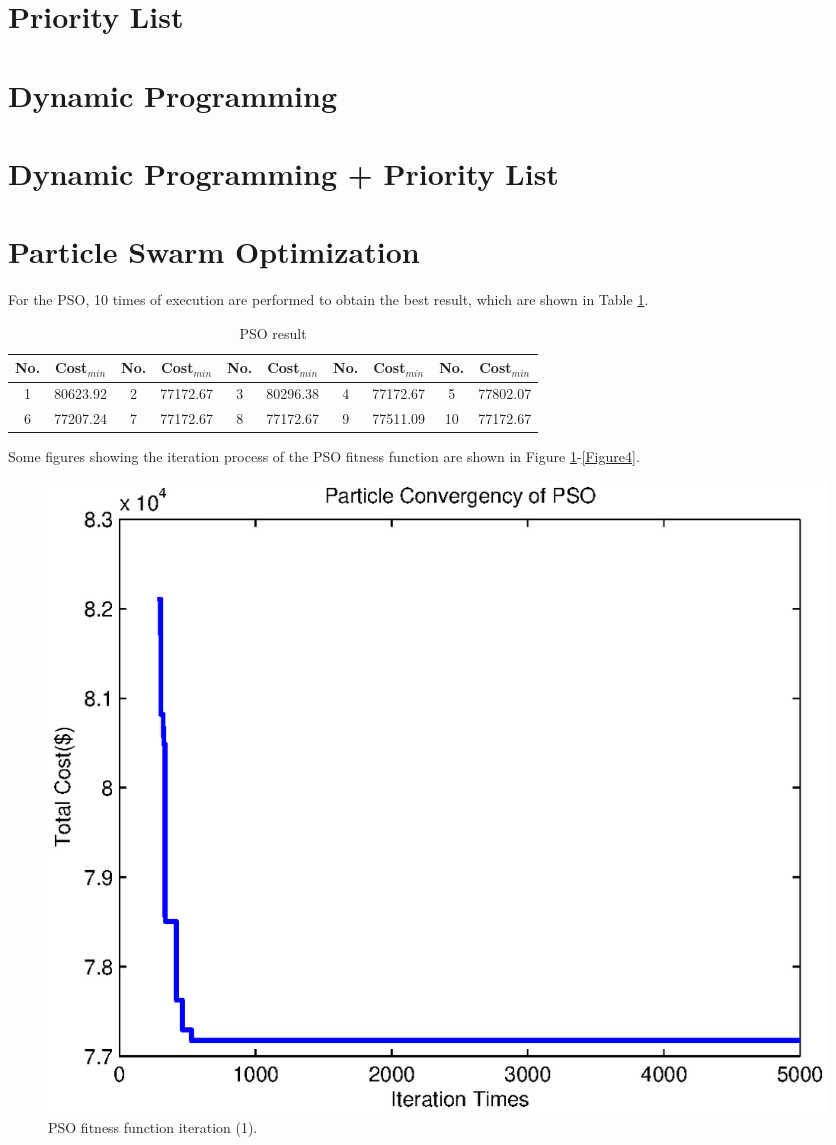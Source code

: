 \documentclass[a4paper, 12pt, notitlepage]{report}
\begin{document}
\section{Priority List}

\clearpage
\section{Dynamic Programming}

\clearpage
\section{Dynamic Programming + Priority List}

\clearpage
\section{Particle Swarm Optimization}
For the PSO, 10 times of execution are performed to obtain the best result, which are shown in Table \ref{table:table3}.

\begin{table}
\centering
\begin{tabular}{ | c | c || c | c || c | c || c | c || c | c |}
\hline
No. & Cost$_{min}$  & No. & Cost$_{min}$  & No. & Cost$_{min}$ & No. & Cost$_{min}$ & No. & Cost$_{min}$\\
\hline
1 & 80623.92  & 2 & 77172.67 & 3 & 80296.38 & 4 & 77172.67 & 5  & 77802.07\\
\hline
6 & 77207.24  & 7 & 77172.67 & 8 & 77172.67 & 9 & 77511.09 & 10 & 77172.67\\
\hline
\end{tabular}
\caption{PSO result}
\label{table:table3}
\end{table}

Some figures showing the iteration process of the PSO fitness function are shown in Figure \ref{Figure2}-\ref{Figure4}.

\begin{figure}
\centering
\includegraphics[height=0.6\textwidth]{2.eps}
\caption{PSO fitness function iteration (1).}
\label{Figure2}
\end{figure}
\end{document}
